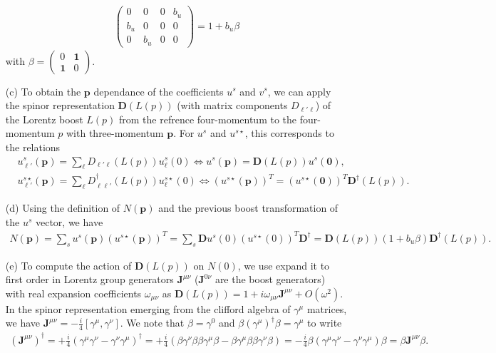 \documentclass[10pt, a4paper]{article}
\begin{document}
\begin{enumerate}
\begin{align*}
\begin{pmatrix}
      0 & 0 & 0 & b_u\\
      b_u & 0 & 0 & 0\\
      0 & b_u & 0 & 0
    \end{pmatrix} =  1 + b_u \beta 
  \end{align*}
  with $\beta = \begin{pmatrix}
    0 & \mathbf{1}\\
    \mathbf{1} & 0 
  \end{pmatrix}$.
  \item[(c)] To obtain the $\mathbf{p}$ dependance of the coefficients $u^s$ and $v^s$, we can apply the spinor representation $\mathbf{D}(L(p))$ (with matrix components $D_{\ell' \ell}$) of the Lorentz boost $L(p)$ from the refrence four-momentum to the four-momentum $p$ with three-momentum $\mathbf{p}$. For $u^s$ and $u^{s\star}$, this corresponds to the relations 
  \begin{align*}
    &u^s_{\ell'}(\mathbf{p}) = \sum_{\ell} D_{\ell' \ell} (L(p)) u_{\ell}^{s}(0) \iff u^s(\mathbf{p}) = \mathbf{D}(L(p))u^s(\mathbf{0}),\\
    &u^{s\star}_{\ell'}(\mathbf{p}) = \sum_{\ell} D_{\ell \ell'}^\dagger (L(p)) u_{\ell}^{s\star}(0) \iff (u^{s\star}(\mathbf{p}))^T =  (u^{s\star}(\mathbf{0}))^T \mathbf{D}^\dagger(L(p)).
  \end{align*}
  \item[(d)] Using the definition of $N(\mathbf{p})$ and the previous boost transformation of the $u^s$ vector, we have 
  \begin{align*}
    N(\mathbf{p}) =  \sum_s  u^{s}(\mathbf{p}) (u^{s\star}(\mathbf{p}))^T =  \sum_s  \mathbf{D} u^{s}(0) (u^{s\star}(0))^T \mathbf{D}^\dagger = \mathbf{D}(L(p)) (1 + b_u \beta) \mathbf{D}^\dagger(L(p)).
  \end{align*} 
  \newpage
  \item[(e)] To compute the action of $\mathbf{D}(L(p))$ on $N(0)$, we use expand it to first order in Lorentz group generators $\mathbf{J}^{\mu \nu}$ ($\mathbf{J}^{0\nu}$ are the boost generators) with real expansion coefficients $\omega_{\mu\nu}$ as $\mathbf{D}(L(p)) = 1 + i \omega_{\mu\nu} \mathbf{J}^{\mu\nu} + O(\omega^2)$. In the spinor representation emerging from the clifford algebra of $\gamma^\mu$ matrices, we have $\mathbf{J}^{\mu\nu} = -\frac{i}{4}[\gamma^\mu, \gamma^\nu]$. We note that $\beta = \gamma^0$ and $\beta (\gamma^\mu)^\dagger \beta = \gamma^\mu$ to write 
  \begin{align*}
    (\mathbf{J}^{\mu\nu})^{\dagger} = +\frac{i}{4}(\gamma^\mu\gamma^\nu - \gamma^\nu \gamma^\mu)^\dagger = +\frac{i}{4}(\beta \gamma^\nu \beta \beta \gamma^\mu \beta - \beta \gamma^\mu \beta \beta\gamma^\nu\beta) = -\frac{i}{4}\beta( \gamma^\mu \gamma^\nu - \gamma^\nu \gamma^\mu )\beta = \beta \mathbf{J}^{\mu\nu} \beta.

\end{align*}
\end{enumerate}
\end{document}
